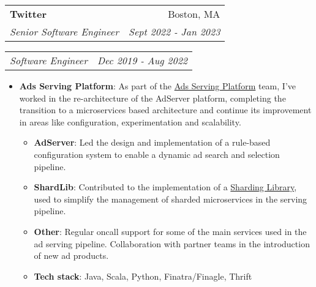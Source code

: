 \documentclass[letterpaper,11pt]{article}
\makeatletter
\newcommand{\resumeItem}[2]{
  \item\small{
    \textbf{#1}{: #2 \vspace{-2pt}}
  }
}
\newcommand{\resumeSubheading}[4]{
  \vspace{-1pt}\item
    \begin{tabular*}{0.97\textwidth}[t]{l@{\extracolsep{\fill}}r}
      \textbf{#1} & #2 \\
      \textit{\small#3} & \textit{\small #4} \\
    \end{tabular*}\vspace{-5pt}
}
\newcommand{\resumeSubSubheading}[2]{
    \begin{tabular*}{0.97\textwidth}{l@{\extracolsep{\fill}}r}
      \textit{\small#1} & \textit{\small #2} \\
    \end{tabular*}\vspace{-5pt}
}
\newcommand{\resumeSubItem}[2]{\resumeItem{#1}{#2}\vspace{-1pt}}
\newcommand{\resumeSubHeadingListStart}{\begin{itemize}[leftmargin=*]}
\newcommand{\resumeSubHeadingListEnd}{\end{itemize}\vspace{5pt}}
\newcommand{\resumeItemListStart}{\begin{itemize}}
\newcommand{\resumeItemListEnd}{\end{itemize}\vspace{-5pt}}
\def \ASP{https://blog.twitter.com/engineering/en_us/topics/infrastructure/2020/building-twitters-ad-platform-architecture-for-the-future}
\def \ShardLib{https://blog.twitter.com/engineering/en_us/topics/infrastructure/2021/sharding-simplification-and-twitters-ads-serving-platform}
\makeatother
\begin{document}
    \resumeSubheading
      {Twitter}{Boston, MA}
      {Senior Software Engineer}{Sept 2022 - Jan 2023}
    \resumeSubSubheading
      {Software Engineer}{Dec 2019 - Aug 2022}
      \resumeItemListStart
        \resumeItem{Ads Serving Platform}
          {As part of the \href{\ASP}{Ads Serving Platform} team, I've worked in the re-architecture of the AdServer platform,
          completing the transition to a microservices based architecture and continue its improvement
          in areas like configuration, experimentation and scalability.}
        \resumeSubHeadingListStart
          \resumeSubItem{AdServer}{Led the design and implementation of a rule-based configuration
          system to enable a dynamic ad search and selection pipeline.}
          \resumeSubItem{ShardLib}{Contributed to the implementation of a \href{\ShardLib}{Sharding Library},
          used to simplify the management of sharded microservices in the serving pipeline.}
          \resumeSubItem{Other}{Regular oncall support for some of the main services used in the ad 
          serving pipeline. Collaboration with partner teams in the introduction of new ad products.}
          \resumeSubItem{Tech stack} {Java, Scala, Python, Finatra/Finagle, Thrift}
        \resumeSubHeadingListEnd
      \resumeItemListEnd
      
\end{document}
